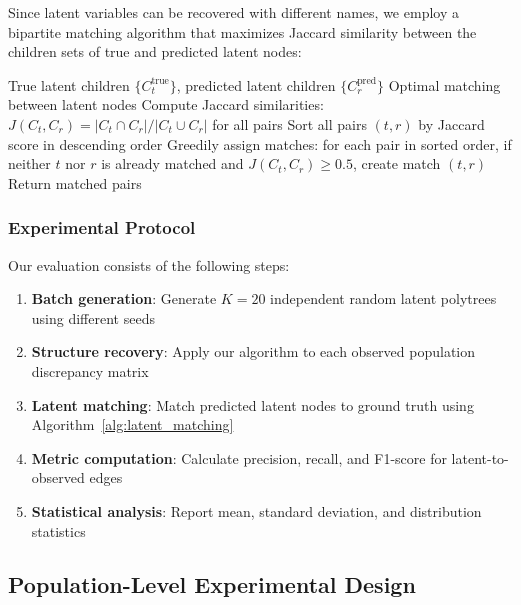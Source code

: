 \documentclass[11pt,a4paper]{article}
\numberwithin{equation}{section}
\begin{document}
Since latent variables can be recovered with different names, we employ a bipartite matching algorithm that maximizes Jaccard similarity between the children sets of true and predicted latent nodes:

\begin{algorithm}[H]
\caption{Latent Node Matching}
\label{alg:latent_matching}
\begin{algorithmic}[1]
    \Require True latent children $\{C_t^{\text{true}}\}$, predicted latent children $\{C_r^{\text{pred}}\}$
    \Ensure Optimal matching between latent nodes
    \State Compute Jaccard similarities: $J(C_t, C_r) = |C_t \cap C_r| / |C_t \cup C_r|$ for all pairs
    \State Sort all pairs $(t, r)$ by Jaccard score in descending order
    \State Greedily assign matches: for each pair in sorted order, if neither $t$ nor $r$ is already matched and $J(C_t, C_r) \geq 0.5$, create match $(t, r)$
    \State Return matched pairs
\end{algorithmic}
\end{algorithm}

\subsubsection{Experimental Protocol}

Our evaluation consists of the following steps:

\begin{enumerate}[label=(\arabic*)]
\item \textbf{Batch generation}: Generate $K = 20$ independent random latent polytrees using different seeds
\item \textbf{Structure recovery}: Apply our algorithm to each observed population discrepancy matrix
\item \textbf{Latent matching}: Match predicted latent nodes to ground truth using Algorithm~\ref{alg:latent_matching}
\item \textbf{Metric computation}: Calculate precision, recall, and F1-score for latent-to-observed edges
\item \textbf{Statistical analysis}: Report mean, standard deviation, and distribution statistics
\end{enumerate}



\subsection{Population-Level Experimental Design}
\label{subsubsec:pop_experiments}
\end{document}
